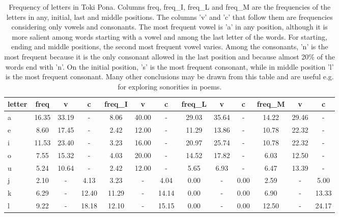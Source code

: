 \begin{table*}[h!]
\scriptsize
\begin{center}
\caption{Frequency of letters in Toki Pona. Columns
                    freq, freq\_I, freq\_L and freq\_M are
                    the frequencies of the letters in any, initial, last and middle
                    positions.
                    The columns 'v' and 'c' that follow them are frequencies
                    considering only vowels and consonants.
                    The most frequent vowel is 'a' in any position,
                    although it is more salient among words starting with a vowel
                    and among the last letter of the words.
                    For starting, ending and middle positions, the second most frequent
                    vowel varies.
                    Among the consonants, 'n' is the most frequent because it is
                    the only consonant allowed in the last position and because
                    almost 20\% of the words end with 'n'.
                    On the initial position, 's' is the most frequent consonant,
                    while in middle position 'l' is the most frequent consonant.
                    Many other conclusions may be drawn from this table and are
                    useful e.g. for exploring sonorities in poems.}\label{freqLet}
\begin{tabular}{  l | c   c   c | c   c   c | c   c   c | c   c   c  }
letter & freq  & v  & c  & freq\_I  & v  & c  & freq\_L  & v  & c  & freq\_M  & v  & c \\\hline
a & 16.35  & 33.19  & -  & 8.06  & 40.00  & -  & 29.03  & 35.64  & -  & 14.22  & 29.46  & - \\
e & 8.60  & 17.45  & -  & 2.42  & 12.00  & -  & 11.29  & 13.86  & -  & 10.78  & 22.32  & - \\
i & 11.53  & 23.40  & -  & 3.23  & 16.00  & -  & 20.97  & 25.74  & -  & 10.78  & 22.32  & - \\
o & 7.55  & 15.32  & -  & 4.03  & 20.00  & -  & 14.52  & 17.82  & -  & 6.03  & 12.50  & - \\
u & 5.24  & 10.64  & -  & 2.42  & 12.00  & -  & 5.65  & 6.93  & -  & 6.47  & 13.39  & - \\\hline
j & 2.10  & -  & 4.13  & 3.23  & -  & 4.04  & 0.00  & -  & 0.00  & 2.59  & -  & 5.00 \\
k & 6.29  & -  & 12.40  & 11.29  & -  & 14.14  & 0.00  & -  & 0.00  & 6.90  & -  & 13.33 \\
l & 9.22  & -  & 18.18  & 12.10  & -  & 15.15  & 0.00  & -  & 0.00  & 12.50  & -  & 24.17 \\\hline

\end{tabular}
\end{center}
\end{table*}
